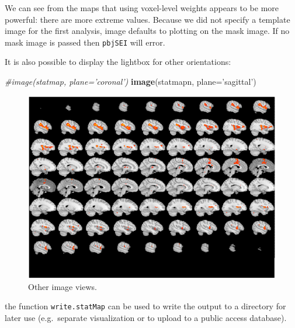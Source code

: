 \documentclass[]{article}
\newenvironment{Shaded}{\begin{snugshade}}{\end{snugshade}}
\newcommand{\CommentTok}[1]{\textcolor[rgb]{0.56,0.35,0.01}{\textit{#1}}}
\newcommand{\DataTypeTok}[1]{\textcolor[rgb]{0.13,0.29,0.53}{#1}}
\newcommand{\KeywordTok}[1]{\textcolor[rgb]{0.13,0.29,0.53}{\textbf{#1}}}
\newcommand{\NormalTok}[1]{#1}
\newcommand{\StringTok}[1]{\textcolor[rgb]{0.31,0.60,0.02}{#1}}
\begin{document}
We can see from the maps that using voxel-level weights appears to be
more powerful: there are more extreme values. Because we did not specify
a template image for the first analysis, image defaults to plotting on
the mask image. If no mask image is passed then \texttt{pbjSEI} will
error.

It is also possible to display the lightbox for other orientations:

\begin{Shaded}
\begin{Highlighting}[]
\CommentTok{#image(statmap, plane='coronal')}
\KeywordTok{image}\NormalTok{(statmapn, }\DataTypeTok{plane=}\StringTok{'sagittal'}\NormalTok{)}
\end{Highlighting}
\end{Shaded}

\begin{figure}
\centering
\includegraphics{introduction_to_pbj_files/figure-latex/unnamed-chunk-8-1.pdf}
\caption{Other image views.}
\end{figure}

the function \texttt{write.statMap} can be used to write the output to a
directory for later use (e.g.~separate visualization or to upload to a
public access database).

\begin{Shaded}
\end{Shaded}
\end{document}
